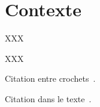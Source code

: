 \chapter*{Contexte}
\label{chap:contexte}


XXX


XXX


Citation entre crochets~\citep{refRE1,refRE2}.

Citation dans le texte~\citet{ref4}.

